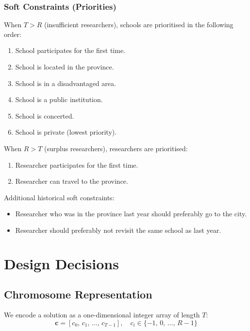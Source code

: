 \documentclass[12pt, a4paper]{article}
\begin{document}
\subsubsection{Soft Constraints (Priorities)}

When $T > R$ (insufficient researchers), schools are prioritised in the following order:
\begin{enumerate}[label=\arabic*., itemsep=0.1em]
  \item School participates for the first time.
  \item School is located in the province.
  \item School is in a disadvantaged area.
  \item School is a public institution.
  \item School is concerted.
  \item School is private (lowest priority).
\end{enumerate}

When $R > T$ (surplus researchers), researchers are prioritised:
\begin{enumerate}[label=\arabic*., itemsep=0.1em]
  \item Researcher participates for the first time.
  \item Researcher can travel to the province.
\end{enumerate}

Additional historical soft constraints:
\begin{itemize}[itemsep=0.1em]
  \item Researcher who was in the province last year should preferably go to the city.
  \item Researcher should preferably not revisit the same school as last year.
\end{itemize}

\section{Design Decisions}

\subsection{Chromosome Representation}

We encode a solution as a one-dimensional integer array of length $T$:
\begin{equation}
  \mathbf{c} = [c_0,\, c_1,\, \ldots,\, c_{T-1}], \quad c_i \in \{-1,\, 0,\, \ldots,\, R-1\}
\end{equation}
\end{document}
